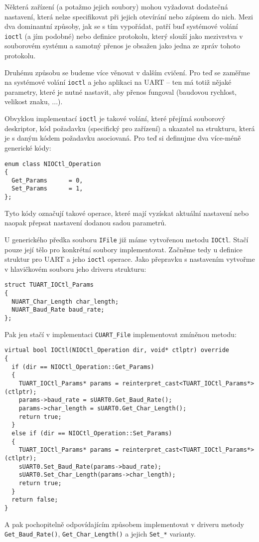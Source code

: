 \documentclass{article}
\begin{document}
Některá zařízení (a potažmo jejich soubory) mohou vyžadovat dodatečná nastavení, která nelze specifikovat při jejich otevírání nebo zápisem do nich. Mezi dva dominantní způsoby, jak se s tím vypořádat, patří buď systémové volání \texttt{ioctl} (a jím podobné) nebo definice protokolu, který slouží jako mezivrstva v souborovém systému a samotný  přenos je obsažen jako jedna ze zpráv tohoto protokolu.

Druhému způsobu se budeme více věnovat v dalším cvičení. Pro teď se zaměřme na systémové volání \texttt{ioctl} a jeho aplikaci na UART -- ten má totiž nějaké parametry, které je nutné nastavit, aby přenos fungoval (baudovou rychlost, velikost znaku, ...).

Obvyklou implementací \texttt{ioctl} je takové volání, které přejímá souborový deskriptor, kód požadavku (specifický pro zařízení) a ukazatel na strukturu, která je s daným kódem požadavku asociovaná. Pro teď si definujme dva více-méně generické kódy:
\begin{lstlisting}
enum class NIOCtl_Operation
{
  Get_Params      = 0,
  Set_Params      = 1,
};
\end{lstlisting}
Tyto kódy označují takové operace, které mají vyzískat aktuální nastavení nebo naopak přepsat nastavení dodanou sadou parametrů.

U generického předka souboru \texttt{IFile} již máme vytvořenou metodu \texttt{IOCtl}. Stačí pouze její tělo pro konkrétní soubory implementovat. Začněme tedy u definice struktur pro UART a jeho \texttt{ioctl} operace. Jako přepravku s nastavením vytvořme v hlavičkovém souboru jeho driveru strukturu:
\begin{lstlisting}
struct TUART_IOCtl_Params
{
  NUART_Char_Length char_length;
  NUART_Baud_Rate baud_rate;
};
\end{lstlisting}
Pak jen stačí v implementaci \texttt{CUART\_File} implementovat zmíněnou metodu:
\begin{lstlisting}
virtual bool IOCtl(NIOCtl_Operation dir, void* ctlptr) override
{
  if (dir == NIOCtl_Operation::Get_Params)
  {
    TUART_IOCtl_Params* params = reinterpret_cast<TUART_IOCtl_Params*>(ctlptr);
    params->baud_rate = sUART0.Get_Baud_Rate();
    params->char_length = sUART0.Get_Char_Length();
    return true;
  }
  else if (dir == NIOCtl_Operation::Set_Params)
  {
    TUART_IOCtl_Params* params = reinterpret_cast<TUART_IOCtl_Params*>(ctlptr);
    sUART0.Set_Baud_Rate(params->baud_rate);
    sUART0.Set_Char_Length(params->char_length);
    return true;
  }
  return false;
}
\end{lstlisting}
A pak pochopitelně odpovídajícím způsobem implementovat v driveru metody \texttt{Get\_Baud\_Rate()}, \texttt{Get\_Char\_Length()} a jejich \texttt{Set\_*} varianty.
\end{document}
